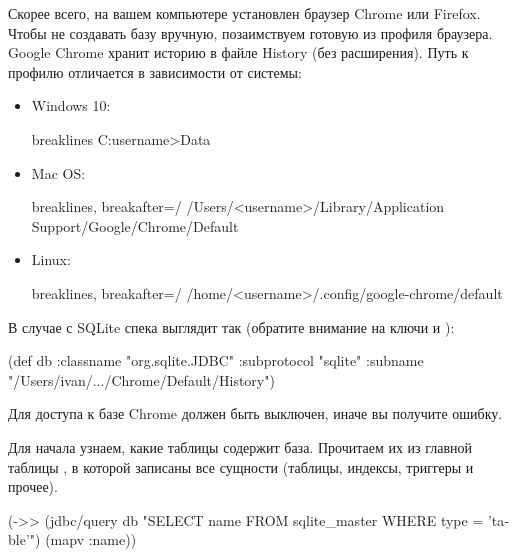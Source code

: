 Скорее всего, на вашем компьютере установлен браузер Chrome или Firefox. Чтобы не создавать базу вручную, позаимствуем готовую из профиля браузера. Google Chrome хранит историю в файле History (без расширения). Путь к профилю отличается в зависимости от системы:

\begin{itemize}

\item{Windows 10:
\begin{english}
  \begin{text*}{breaklines}
C:\Users\<username>\AppData\Local\Google\Chrome\User Data\Default
  \end{text*}
\end{english}}


\item{Mac OS:
\begin{english}
  \begin{text*}{breaklines, breakafter=/}
/Users/<username>/Library/Application Support/Google/Chrome/Default
  \end{text*}
\end{english}}

\item{Linux:
\begin{english}
  \begin{text*}{breaklines, breakafter=/}
/home/<username>/.config/google-chrome/default
  \end{text*}
\end{english}}

\end{itemize}

В случае с SQLite спека выглядит так (обратите внимание на ключи  и ):

\begin{english}
  \begin{clojure}
(def db
  {:classname "org.sqlite.JDBC"
   :subprotocol "sqlite"
   :subname "/Users/ivan/.../Chrome/Default/History"})
  \end{clojure}
\end{english}

Для доступа к базе Chrome должен быть выключен, иначе вы получите ошибку.

Для начала узнаем, какие таблицы содержит база. Прочитаем их из главной таблицы , в которой записаны все сущности (таблицы, индексы, триггеры и прочее).

\begin{english}
  \begin{clojure}
(->> (jdbc/query db "SELECT name FROM sqlite_master
                     WHERE type = 'table'")
     (mapv :name))
  \end{clojure}
\end{english}

